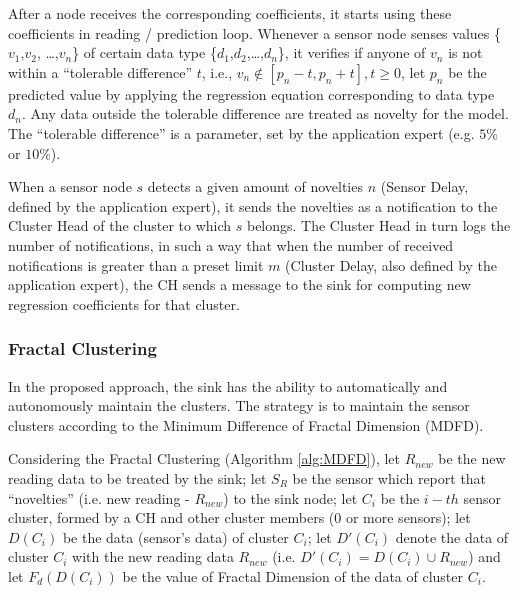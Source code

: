 \documentclass{acm_proc_article-sp}
\begin{document}
After a node receives the corresponding coefficients, it starts using these
coefficients in reading / prediction loop.
Whenever a sensor node senses values \{$v_{1}$,$v_{2}$, \ldots,$v_{n}$\} of
certain data type \{$d_{1}$,$d_{2}$,\ldots,$d_{n}$\}, it verifies if anyone of
$v_{n}$ is not within a ``tolerable difference'' $t$, i.e., $v_{n} \not \in
[p_{n}-t,p_{n}+t], t \geq 0$, let $p_{n}$ be the predicted value by applying
the regression equation corresponding to data type $d_{n}$. Any data outside the
tolerable difference are treated as novelty for the model.
The ``tolerable difference'' is a parameter, set by the application expert (e.g.
$5\%$ or $10\%$).



When a sensor node $s$ detects a given amount of novelties $n$ (Sensor Delay,
defined by the application expert), it sends the novelties as a notification to
the Cluster Head of the cluster to which $s$ belongs. The Cluster Head in turn
logs the number of notifications, in such a way that when the number of received
notifications is greater than a preset limit $m$ (Cluster Delay, also
defined by the application expert), the CH sends a message to the sink for
computing new regression coefficients for that cluster.


\subsubsection{Fractal Clustering}
\label{cluster-maintenance}

In the proposed approach, the sink has the ability to automatically and
autonomously maintain the clusters. The strategy is to maintain the sensor
clusters according to the Minimum Difference of Fractal Dimension (MDFD).

Considering the Fractal Clustering (Algorithm \ref{alg:MDFD}), let $R_{new}$ be
the new reading data to be treated by the sink; let $S_{R}$ be the sensor which
report that ``novelties'' (i.e. new reading - $R_{new}$) to the sink node; let
$C_i$ be the $i-th$ sensor cluster, formed by a CH and other cluster members (0
or more sensors); let $D(C_i)$ be the data (sensor's data) of cluster $C_i$; let
$D'(C_i)$ denote the data of cluster $C_i$ with the new reading data $R_{new}$
(i.e. $D'(C_i) = D(C_i) \cup R_{new}$) and let $F_{d}(D(C_i))$ be the value of
Fractal Dimension of the data of cluster $C_i$.
\end{document}
